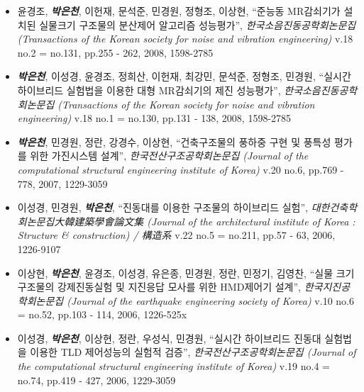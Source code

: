 \begin{itemize}
\item[]
  윤경조, \emph{\textbf{박은천}}, 이헌재, 문석준, 민경원, 정형조, 이상현,
  ``준능동 MR감쇠기가 설치된 실물크기 구조물의 분산제어 알고리즘
  성능평가'', \emph{한국소음진동공학회논문집 (Transactions of the Korean
  society for noise and vibration engineering)} v.18 no.2 = no.131,
  pp.255 - 262, 2008, 1598-2785
\item[]
  \emph{\textbf{박은천}}, 이성경, 윤경조, 정희산, 이헌재, 최강민, 문석준,
  정형조, 민경원, ``실시간 하이브리드 실험법을 이용한 대형 MR감쇠기의
  제진 성능평가'', \emph{한국소음진동공학회논문집 (Transactions of the
  Korean society for noise and vibration engineering)} v.18 no.1 =
  no.130, pp.131 - 138, 2008, 1598-2785
\item[]
  \emph{\textbf{박은천}}, 민경원, 정란, 강경수, 이상현, ``건축구조물의 풍하중
  구현 및 풍특성 평가를 위한 가진시스템 설계'',
  \emph{한국전산구조공학회논문집 (Journal of the computational
  structural engineering institute of Korea)} v.20 no.6, pp.769 - 778,
  2007, 1229-3059
\item[]
  이성경, 민경원, \emph{\textbf{박은천}}, ``진동대를 이용한 구조물의 하이브리드
  실험'', \emph{대한건축학회논문집大韓建築學會論文集 (Journal of the
  architectural institute of Korea : Structure \& construction) /
  構造系} v.22 no.5 = no.211, pp.57 - 63, 2006, 1226-9107
\item[]
  이상현, \emph{\textbf{박은천}}, 윤경조, 이성경, 유은종, 민경원, 정란, 민정기,
  김영찬, ``실물 크기 구조물의 강제진동실험 및 지진응답 모사를 위한
  HMD제어기 설계'', \emph{한국지진공학회논문집 (Journal of the
  earthquake engineering society of Korea)} v.10 no.6 = no.52, pp.103 -
  114, 2006, 1226-525x
\item[]
  이성경, \emph{\textbf{박은천}}, 이상현, 정란, 우성식, 민경원, ``실시간
  하이브리드 진동대 실험법을 이용한 TLD 제어성능의 실험적 검증'',
  \emph{한국전산구조공학회논문집 (Journal of the computational
  structural engineering institute of Korea)} v.19 no.4 = no.74, pp.419
  - 427, 2006, 1229-3059
\end{itemize}

